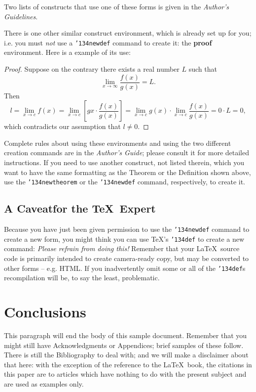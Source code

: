 \documentclass[acmtog, authorversion]{acmart}
\begin{document}
Two lists of constructs that use one of these forms is given in
the \textit{Author's  Guidelines}.

There is one other similar construct environment, which is already
set up for you; i.e. you must \textit{not} use a
\texttt{{\char'134}newdef} command to create it: the
\textbf{proof} environment.  Here is a example of its use:
\begin{proof}
Suppose on the contrary there exists a real number $L$ such that
\begin{displaymath}
\lim_{x\rightarrow\infty} \frac{f(x)}{g(x)} = L.
\end{displaymath}
Then
\begin{displaymath}
l=\lim_{x\rightarrow c} f(x) = \lim_{x\rightarrow c} \left[ g{x}
\cdot \frac{f(x)}{g(x)} \right ] = \lim_{x\rightarrow c} g(x)
\cdot \lim_{x\rightarrow c} \frac{f(x)}{g(x)} = 0\cdot L = 0,
\end{displaymath}
which contradicts our assumption that $l\neq 0$.
\end{proof}

Complete rules about using these environments and using the two
different creation commands are in the \textit{Author's Guide};
please consult it for more detailed instructions.  If you need to
use another construct, not listed therein, which you want to have
the same formatting as the Theorem or the
Definition\cite{salas:calculus} shown above, use the
\texttt{{\char'134}newtheorem} or the \texttt{{\char'134}newdef}
command, respectively, to create it.

\subsection*{A Caveatfor the \TeX\ Expert}
Because you have just been given permission to use the
\texttt{{\char'134}newdef} command to create a new form, you might
think you can use \TeX's \texttt{{\char'134}def} to create a new
command: \textit{Please refrain from doing this!} Remember that
your \LaTeX\ source code is primarily intended to create
camera-ready copy, but may be converted to other forms -- e.g.
HTML. If you inadvertently omit some or all of the
\texttt{{\char'134}def}s recompilation will be, to say the least,
problematic.

\section{Conclusions}
This paragraph will end the body of this sample document. Remember
that you might still have Acknowledgments or Appendices; brief
samples of these follow.  There is still the Bibliography to deal
with; and we will make a disclaimer about that here: with the
exception of the reference to the \LaTeX\ book, the citations in
this paper are to articles which have nothing to do with the
present subject and are used as examples only.
\end{document}

